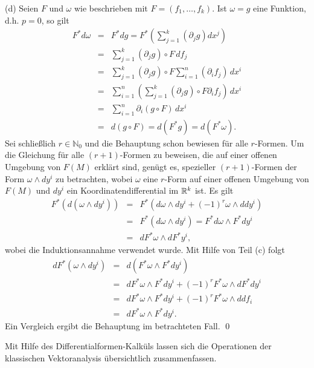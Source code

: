 \documentclass[a4paper,twoside,DIV15,BCOR12mm]{scrbook}
\begin{document}
\noindent
(d) Seien $F$ und $\omega$ wie beschrieben mit $F = 
(f_{1},\dots,f_{k})$. Ist $\omega = g$ eine Funktion, d.h. $p = 0$, so 
gilt
\begin{eqnarray*}
F^{*}d\omega & = & F^{*}dg = F^{*} 
\left(\sum_{j=1}^{k}(\partial_{j}g) dx^{j}\right) \\
& = & \sum_{j=1}^{k} (\partial_{j}g) \circ F \, df_{j} \\
& = & \sum_{j=1}^{k} (\partial_{j}g) \circ F 
\sum_{i=1}^{n}(\partial_{i}f_{j})\, dx^{i} \\
& = & \sum_{i=1}^{n} \left(\sum_{j=1}^{k} (\partial_{j}g) \circ F 
\partial_{i} f_{j}\right) \, dx^{i} \\
& = & \sum_{i=1}^{n} \partial_{i}(g \circ F) \, dx^{i} \\
& = & d(g \circ F) = d(F^{*}g) = d(F^{*}\omega). 
\end{eqnarray*}
Sei schließlich $r \in {\mathbb N}_{0}$ und die Behauptung schon 
bewiesen für alle $r$-Formen. Um die Gleichung für alle 
$(r+1)$-Formen zu beweisen, die auf einer offenen Umgebung von $F(M)$ erklärt sind,
 genügt es, spezieller $(r+1)$-Formen der 
Form $\omega \wedge dy^{i}$ zu betrachten, wobei $\omega$ eine 
$r$-Form auf einer offenen Umgebung von $F(M)$ und $dy^i$ ein Koordinatendifferential  
im $\mathbb{R}^k$ ist. Es gilt
\begin{eqnarray*} 
 F^{*}(d(\omega \wedge dy^{i})) &=& F^{*}(d\omega \wedge dy^{i} + 
(-1)^{r} \omega \wedge ddy^{i}) \\
& = & F^{*}(d\omega \wedge dy^{i}) = F^{*} d\omega \wedge 
F^{*}dy^{i} \\
& = & dF^{*}\omega \wedge dF^{*} y^{i},
\end{eqnarray*}
wobei die Induktionsannahme  verwendet 
wurde. Mit Hilfe von Teil (c) folgt
\begin{eqnarray*}
 dF^{*}(\omega \wedge dy^{i}) &=& d(F^{*} \omega \wedge 
F^{*}dy^{i}) \\
& = & dF^{*} \omega \wedge F^{*} dy^{i} + (-1)^{r} F^{*} \omega 
\wedge dF^{*} dy^{i} \\
& = & dF^{*} \omega \wedge F^{*} dy^{i} + (-1)^{r} F^{*}\omega \wedge 
dd f_i \\
& = & dF^{*} \omega \wedge F^{*} dy^{i}.
\end{eqnarray*}
Ein Vergleich ergibt die Behauptung im betrachteten Fall. \qed\\

\bigskip

\noindent
Mit Hilfe des Differentialformen-Kalküls lassen sich die Operationen 
der klassischen Vektoranalysis übersichtlich zusammenfassen.
\end{document}
